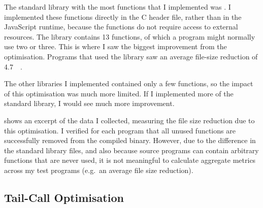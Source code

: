 \documentclass[00-main.tex]{subfiles}
\begin{document}
The standard library with the most functions that I implemented was .
I implemented these functions directly in the C header file, rather than in the JavaScript runtime, because the functions do not require access to external resources.
The library contains 13 functions, of which a program might normally use two or three.
This is where I saw the biggest improvement from the optimisation.
Programs that used the  library saw an average file-size reduction of \SI{4.7}{\kilo\byte}.

The other libraries I implemented contained only a few functions, so the impact of this optimisation was much more limited.
If I implemented more of the standard library, I would see much more improvement.

 shows an excerpt of the data I collected, measuring the file size reduction due to this optimisation.
I verified for each program that all unused functions are successfully removed from the compiled binary.
However, due to the difference in the standard library files, and also because source programs can contain arbitrary functions that are never used, it is not meaningful to calculate aggregate metrics across my test programs (e.g.~an average file size reduction).

\begin{table}[t]
  \centering
  \caption{Examples of file size reductions from unreachable procedure elimination.}%
  \label{tab:unreachable procedure elimination data}
\end{table}

\subsection{Tail-Call Optimisation}\label{sec:eval:tail-call optimisation}
\end{document}
